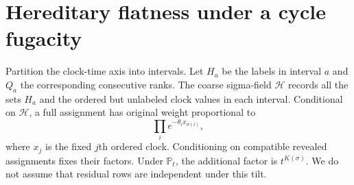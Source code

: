 \documentclass[11pt]{article}
\numberwithin{equation}{section}
\theoremstyle{definition}
\theoremstyle{remark}
\newcommand{\Pp}{\mathbb P}
\newcommand{\cH}{\mathcal H}
\begin{document}
\section{Hereditary flatness under a cycle fugacity}\label{sec:row}

Partition the clock-time axis into intervals. Let $H_a$ be the labels in interval $a$ and $Q_a$ the corresponding consecutive ranks. The coarse sigma-field $\cH$ records all the sets $H_a$ and the ordered but unlabeled clock values in each interval. Conditional on $\cH$, a full assignment has original weight proportional to
\begin{equation}\label{eq:matching-weight}
 \prod_i e^{-\theta_i x_{\sigma(i)}},
\end{equation}
where $x_j$ is the fixed $j$th ordered clock. Conditioning on compatible revealed assignments fixes their factors. Under $\Pp_t$, the additional factor is $t^{K(\sigma)}$. We do not assume that residual rows are independent under this tilt.
\end{document}
